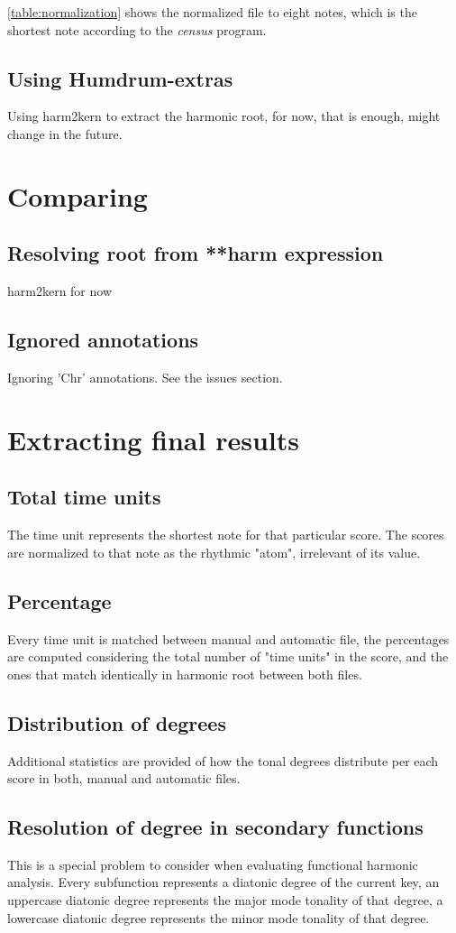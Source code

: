 	\autoref{table:normalization} shows the normalized file to eight notes, which is the shortest note according to the \emph{census} program.

	\subsection{Using Humdrum-extras}
  Using harm2kern to extract the harmonic root, for now, that is enough, might change in the future.
\section{Comparing}
	\subsection{Resolving root from **harm expression}
  harm2kern for now
	\subsection{Ignored annotations}
  Ignoring 'Chr' annotations. See the issues section.
\section{Extracting final results}
	\subsection{Total time units}
  The time unit represents the shortest note for that particular score. The scores are normalized to that note as the rhythmic "atom", irrelevant of its value.
	\subsection{Percentage}
  Every time unit is matched between manual and automatic file, the percentages are computed considering the total number of "time units" in the score, and the ones that match identically in harmonic root between both files.
	\subsection{Distribution of degrees}
  Additional statistics are provided of how the tonal degrees distribute per each score in both, manual and automatic files.
	\subsection{Resolution of degree in secondary functions}
  This is a special problem to consider when evaluating functional harmonic analysis. Every subfunction represents a diatonic degree of the current key, an uppercase diatonic degree represents the major mode tonality of that degree, a lowercase diatonic degree represents the minor mode tonality of that degree.

\newpage
